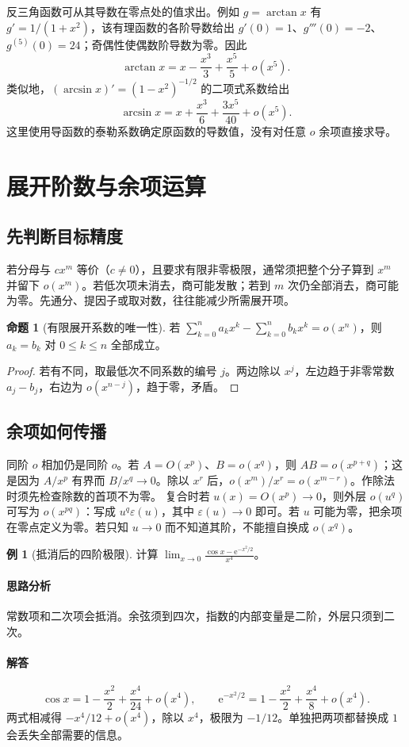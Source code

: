 \documentclass[UTF8,fontset=fandol,12pt,oneside,openany]{ctexrep}
\newcommand{\ee}{\mathrm e}
\theoremstyle{definition}
\newtheorem{proposition}[theorem]{命题}
\newtheorem{example}{例}[chapter]
\begin{document}
反三角函数可从其导数在零点处的值求出。例如 $g=\arctan x$ 有 $g'=1/(1+x^2)$，该有理函数的各阶导数给出 $g'(0)=1$、$g'''(0)=-2$、$g^{(5)}(0)=24$；奇偶性使偶数阶导数为零。因此
\[
\arctan x=x-\frac{x^3}3+\frac{x^5}5+o(x^5).
\]
类似地，$(\arcsin x)'=(1-x^2)^{-1/2}$ 的二项式系数给出
\[
\arcsin x=x+\frac{x^3}6+\frac{3x^5}{40}+o(x^5).
\]
这里使用导函数的泰勒系数确定原函数的导数值，没有对任意 $o$ 余项直接求导。

\section{展开阶数与余项运算}
\label{lec:08:order}
\subsection{先判断目标精度}
若分母与 $cx^m$ 等价（$c\ne0$），且要求有限非零极限，通常须把整个分子算到 $x^m$ 并留下 $o(x^m)$。若低次项未消去，商可能发散；若到 $m$ 次仍全部消去，商可能为零。先通分、提因子或取对数，往往能减少所需展开项。
\begin{proposition}[有限展开系数的唯一性]
若 $\sum_{k=0}^na_kx^k-\sum_{k=0}^nb_kx^k=o(x^n)$，则 $a_k=b_k$ 对 $0\le k\le n$ 全部成立。
\end{proposition}
\begin{proof}若有不同，取最低次不同系数的编号 $j$。两边除以 $x^j$，左边趋于非零常数 $a_j-b_j$，右边为 $o(x^{n-j})$，趋于零，矛盾。\end{proof}
\subsection{余项如何传播}
同阶 $o$ 相加仍是同阶 $o$。若 $A=O(x^p)$、$B=o(x^q)$，则 $AB=o(x^{p+q})$；这是因为 $A/x^p$ 有界而 $B/x^q\to0$。除以 $x^r$ 后，$o(x^m)/x^r=o(x^{m-r})$。作除法时须先检查除数的首项不为零。
复合时若 $u(x)=O(x^p)\to0$，则外层 $o(u^q)$ 可写为 $o(x^{pq})$：写成 $u^q\varepsilon(u)$，其中 $\varepsilon(u)\to0$ 即可。若 $u$ 可能为零，把余项在零点定义为零。若只知 $u\to0$ 而不知道其阶，不能擅自换成 $o(x^q)$。

\begin{example}[抵消后的四阶极限]计算 $\displaystyle\lim_{x\to0}\frac{\cos x-\ee^{-x^2/2}}{x^4}$。\end{example}
\paragraph{思路分析}常数项和二次项会抵消。余弦须到四次，指数的内部变量是二阶，外层只须到二次。
\paragraph{解答}
\[
\cos x=1-\frac{x^2}2+\frac{x^4}{24}+o(x^4),\qquad
\ee^{-x^2/2}=1-\frac{x^2}2+\frac{x^4}8+o(x^4).
\]
两式相减得 $-x^4/12+o(x^4)$，除以 $x^4$，极限为 $-1/12$。单独把两项都替换成 $1$ 会丢失全部需要的信息。
\end{document}
